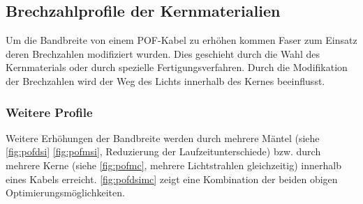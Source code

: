 \subsection{Brechzahlprofile der Kernmaterialien}
\label{subsec:pofbrechzahlprofile}

Um die Bandbreite von einem POF-Kabel zu erhöhen kommen Faser zum Einsatz deren
Brechzahlen modifiziert wurden. Dies geschieht durch die Wahl des Kernmaterials oder durch spezielle Fertigungsverfahren. Durch die Modifikation der Brechzahlen wird der Weg des Lichts innerhalb des Kernes beeinflusst.




\subsubsection{Weitere Profile}

Weitere Erhöhungen der Bandbreite werden durch mehrere Mäntel (siehe
\autoref{fig:pofdsi} \autoref{fig:pofmsi}, Reduzierung der Laufzeitunterschiede)
bzw. durch mehrere Kerne (siehe \autoref{fig:pofmc}, mehrere Lichtstrahlen
gleichzeitig) innerhalb eines Kabels erreicht. \autoref{fig:pofdsimc} zeigt eine
Kombination der beiden obigen Optimierungsmöglichkeiten.
\cite{pofacprofile}


